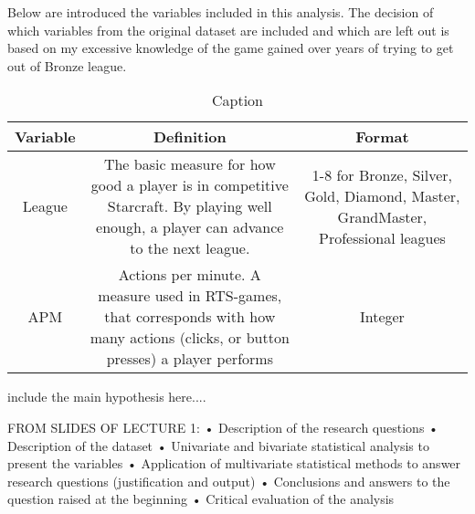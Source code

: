 \documentclass{article}
\begin{document}
Below are introduced the variables included in this analysis. The decision of which variables from the original dataset are included and which are left out is based on my excessive knowledge of the game gained over years of trying to get out of Bronze league.

\begin{table}[]
    \centering
    \begin{adjustbox}{max width=\textwidth}
    \begin{tabular}{ |c|c|c| } 
        \hline
        Variable & Definition & Format \\ 
        \hline
        League & The basic measure for how good a player is in competitive Starcraft. By playing well enough, a player can advance to the next league. & 1-8 for Bronze, Silver, Gold, Diamond, Master, GrandMaster, Professional leagues \\ \hline
        APM & Actions per minute. A measure used in RTS-games, that corresponds with how many actions (clicks, or button presses) a player performs  & Integer \\ \hline
        \hline
    \end{tabular}
    \end{adjustbox}
    \caption{Caption}
    \label{tab:my_label}
\end{table}

include the main hypothesis here....

FROM SLIDES OF LECTURE 1:
• Description of the research questions
• Description of the dataset
• Univariate and bivariate statistical analysis to present the
variables
• Application of multivariate statistical methods to answer
research questions (justification and output)
• Conclusions and answers to the question raised at the
beginning
• Critical evaluation of the analysis
\end{document}
